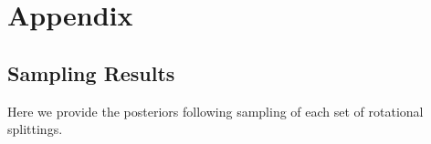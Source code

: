 \section{Appendix}
\subsection{Sampling Results}
Here we provide the posteriors following sampling of each set of rotational splittings.



